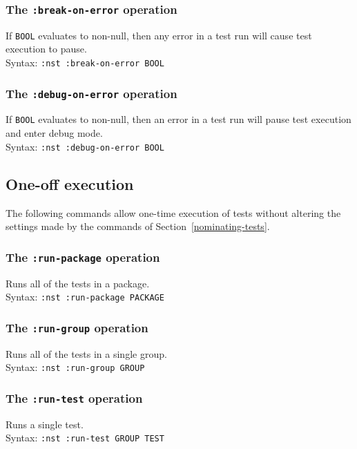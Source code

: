 \subsubsection{The \texttt{:break-on-error} operation}
%
If \texttt{BOOL} evaluates to non-null, then any error in a test run
will cause test execution to pause.
\\ Syntax: \texttt{:nst :break-on-error BOOL}

\subsubsection{The \texttt{:debug-on-error} operation}
%
If \texttt{BOOL} evaluates to non-null, then an error in a test run
will pause test execution and enter debug mode.
\\ Syntax: \texttt{:nst :debug-on-error BOOL}

\subsection{One-off execution}
The following commands allow one-time execution of tests without
altering the settings made by the commands of
Section~\ref{nominating-tests}.

\subsubsection{The \texttt{:run-package} operation}
%
Runs all of the tests in a package.
\\ Syntax: \texttt{:nst :run-package PACKAGE}

\subsubsection{The \texttt{:run-group} operation}
%
Runs all of the tests in a single group.
\\ Syntax: \texttt{:nst :run-group GROUP}

\subsubsection{The \texttt{:run-test} operation}
%
Runs a single test.
\\ Syntax: \texttt{:nst :run-test GROUP TEST}

